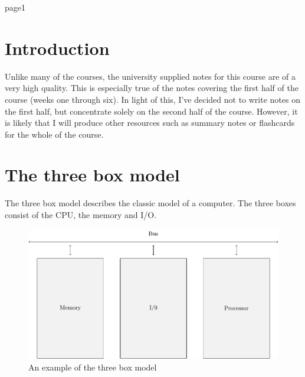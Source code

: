 
\newenvironment{fancyquote}{
	\list{}{
		\leftmargin=0.3in
		\rightmargin=0.3in
	}
		\item[]
	{\endlist}
}

\setcounter{page}{1}

\section*{Introduction}

Unlike many of the courses, the university supplied notes for this course are of
a very high quality. This is especially true of the notes covering the first
half of the course (weeks one through six). In light of this, I've decided not
to write notes on the first half, but concentrate solely on the second half of
the course. However, it is likely that I will produce other resources such as
summary notes or flashcards for the whole of the course.

\section{The three box model}

The three box model describes the classic model of a computer. The three boxes
consist of the CPU, the memory and I/O.

\begin{figure}[ht!]
	\centering
	\includegraphics[width=\textwidth]{three_box_model.pdf}
	\caption{An example of the three box model}
	\label{overflow}
\end{figure}


